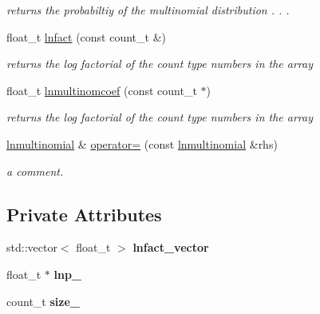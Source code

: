 \begin{DoxyCompactItemize}
\begin{DoxyCompactList}\small\item\em returns the probabiltiy of the multinomial distribution . . . \end{DoxyCompactList}\item 
\hypertarget{classlnmultinomial_ae01a4965d86572aef374ee5a8e56e81f}{float\-\_\-t \hyperlink{classlnmultinomial_ae01a4965d86572aef374ee5a8e56e81f}{lnfact} (const count\-\_\-t \&)}\label{classlnmultinomial_ae01a4965d86572aef374ee5a8e56e81f}

\begin{DoxyCompactList}\small\item\em returns the log factorial of the count type numbers in the array \end{DoxyCompactList}\item 
\hypertarget{classlnmultinomial_aae7815c87e3ce26c3469a2755504fea4}{float\-\_\-t \hyperlink{classlnmultinomial_aae7815c87e3ce26c3469a2755504fea4}{lnmultinomcoef} (const count\-\_\-t $\ast$)}\label{classlnmultinomial_aae7815c87e3ce26c3469a2755504fea4}

\begin{DoxyCompactList}\small\item\em returns the log factorial of the count type numbers in the array \end{DoxyCompactList}\item 
\hyperlink{classlnmultinomial}{lnmultinomial} \& \hyperlink{classlnmultinomial_a32d91724132f83c43e79aa40535fb6a1}{operator=} (const \hyperlink{classlnmultinomial}{lnmultinomial} \&rhs)
\begin{DoxyCompactList}\small\item\em a comment. \end{DoxyCompactList}\end{DoxyCompactItemize}
\subsection*{Private Attributes}
\begin{DoxyCompactItemize}
\item 
\hypertarget{classlnmultinomial_a8734990fea13a322020455e1e161b9fe}{std\-::vector$<$ float\-\_\-t $>$ {\bfseries lnfact\-\_\-vector}}\label{classlnmultinomial_a8734990fea13a322020455e1e161b9fe}

\item 
\hypertarget{classlnmultinomial_ae4478c79ab8320db8a0b7a94399c6d85}{float\-\_\-t $\ast$ {\bfseries lnp\-\_\-}}\label{classlnmultinomial_ae4478c79ab8320db8a0b7a94399c6d85}

\item 
\hypertarget{classlnmultinomial_a3217e435e8d44cd7f99235b9df7784c5}{count\-\_\-t {\bfseries size\-\_\-}}\label{classlnmultinomial_a3217e435e8d44cd7f99235b9df7784c5}

\end{DoxyCompactItemize}


